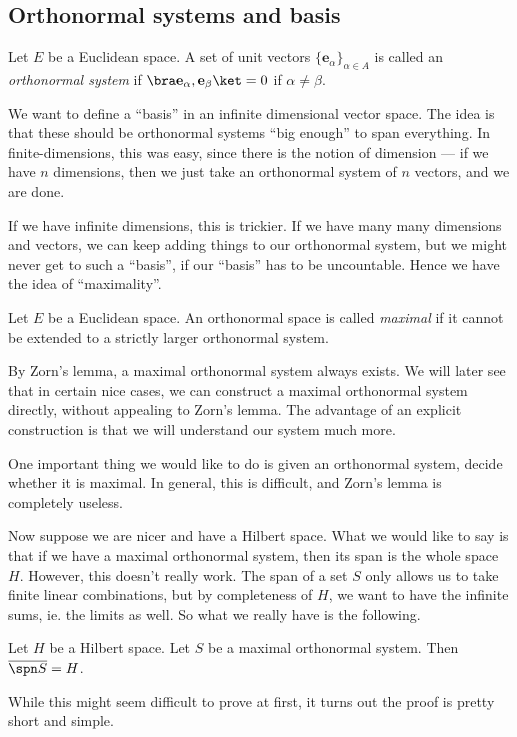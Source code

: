 \documentclass[a4paper]{article}
\begin{document}
\subsection{Orthonormal systems and basis}
\begin{defi}
  Let $E$ be a Euclidean space. A set of unit vectors $\{\mathbf{e}_\alpha\}_{\alpha \in A}$ is called an \emph{orthonormal system} if $\bra \mathbf{e}_\alpha, \mathbf{e}_\beta\ket = 0$ if $\alpha \not= \beta$.
\end{defi}

We want to define a ``basis'' in an infinite dimensional vector space. The idea is that these should be orthonormal systems ``big enough'' to span everything. In finite-dimensions, this was easy, since there is the notion of dimension --- if we have $n$ dimensions, then we just take an orthonormal system of $n$ vectors, and we are done.

If we have infinite dimensions, this is trickier. If we have many many dimensions and vectors, we can keep adding things to our orthonormal system, but we might never get to such a ``basis'', if our ``basis'' has to be uncountable. Hence we have the idea of ``maximality''.

\begin{defi}
  Let $E$ be a Euclidean space. An orthonormal space is called \emph{maximal} if it cannot be extended to a strictly larger orthonormal system.
\end{defi}
By Zorn's lemma, a maximal orthonormal system always exists. We will later see that in certain nice cases, we can construct a maximal orthonormal system directly, without appealing to Zorn's lemma. The advantage of an explicit construction is that we will understand our system much more.

One important thing we would like to do is given an orthonormal system, decide whether it is maximal. In general, this is difficult, and Zorn's lemma is completely useless.

Now suppose we are nicer and have a Hilbert space. What we would like to say is that if we have a maximal orthonormal system, then its span is the whole space $H$. However, this doesn't really work. The span of a set $S$ only allows us to take finite linear combinations, but by completeness of $H$, we want to have the infinite sums, ie. the limits as well. So what we really have is the following.

\begin{prop}
  Let $H$ be a Hilbert space. Let $S$ be a maximal orthonormal system. Then $\overline{\spn S} = H$.
\end{prop}
While this might seem difficult to prove at first, it turns out the proof is pretty short and simple.
\end{document}
